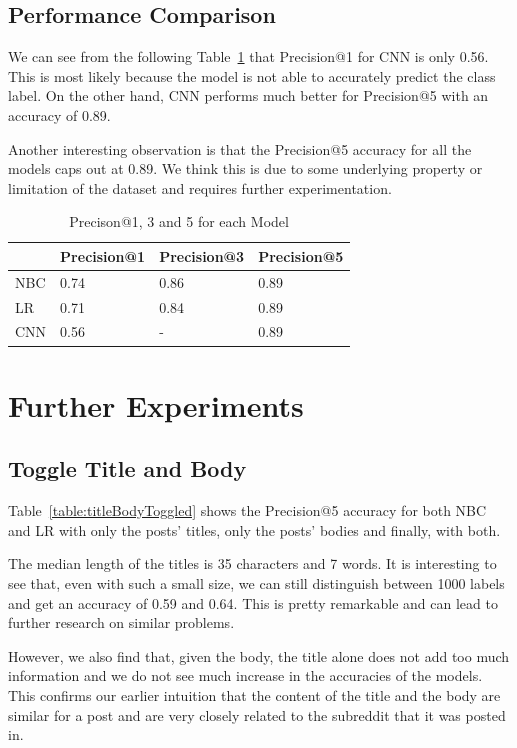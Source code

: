 \documentclass{sig-alternate-05-2015}
\begin{document}
\subsection{Performance Comparison}

We can see from the following Table~\ref{table:performanceComparison} that Precision@1 for CNN is only 0.56. This is most likely because the model is not able to accurately predict the class label. On the other hand, CNN performs much better for Precision@5 with an accuracy of 0.89. 

Another interesting observation is that the Precision@5 accuracy for all the models caps out at 0.89. We think this is due to some underlying property or limitation of the dataset and requires further experimentation.

\begin{table}[H]
\begin{tabular}{|l|l|l|l|}
\hline
    & Precision@1 & Precision@3 & Precision@5 \\ \hline
NBC & 0.74        & 0.86        & 0.89        \\ \hline
LR  & 0.71        & 0.84        & 0.89       \\ \hline
CNN & 0.56        & -           & 0.89        \\ \hline
\end{tabular}
\caption{Precison@1, 3 and 5 for each Model}
\label{table:performanceComparison}
\end{table}

\section{Further Experiments}
\subsection{Toggle Title and Body}

Table~\ref{table:titleBodyToggled} shows the Precision@5 accuracy for both NBC and LR with only the posts' titles, only the posts' bodies and finally, with both. 

The median length of the titles is 35 characters and 7 words. It is interesting to see that, even with such a small size, we can still distinguish between 1000 labels and get an accuracy of 0.59 and 0.64. This is pretty remarkable and can lead to further research on similar problems.

However, we also find that, given the body, the title alone does not add too much information and we do not see much increase in the accuracies of the models. This confirms our earlier intuition that the content of the title and the body are similar for a post and are very closely related to the subreddit that it was posted in.
\end{document}
